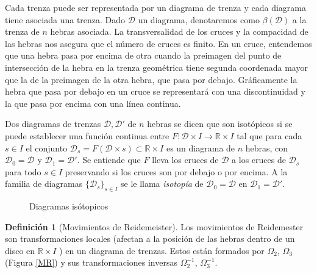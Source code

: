 \documentclass[12pt]{book}
\theoremstyle{definition}
\newtheorem{defi}{Definición}[section]
\begin{document}
Cada trenza puede ser representada por un diagrama de trenza y cada diagrama tiene asociada una trenza. Dado $\mathcal{D}$ un diagrama, denotaremos como $\beta(\mathcal{D})$ a la trenza de $n$ hebras asociada. La transversalidad de los cruces y la compacidad de las hebras nos asegura que el número de cruces es finito. En un cruce, entendemos que una hebra pasa por encima de otra cuando la preimagen del punto de intersección de la hebra en la trenza geométrica tiene segunda coordenada mayor que la de la preimagen de la otra hebra, que pasa por debajo. Gráficamente la hebra que pasa por debajo en un cruce se representará con una discontinuidad y la que pasa por encima con una línea continua. 

Dos diagramas de trenzas $\mathcal{D}, \mathcal{D}'$ de $n$ hebras se dicen que son isotópicos si se puede establecer una función continua entre $F:\mathcal{D}\times I\rightarrow\mathbb{R}\times I$ tal que para cada $s\in I$ el conjunto $\mathcal{D}_s = F(\mathcal{D}\times s)\subset\mathbb{R}\times I$ es un diagrama de $n$ hebras, con $\mathcal{D}_0 = \mathcal{D}$ y $\mathcal{D}_1 = \mathcal{D}'$. Se entiende que $F$ lleva los cruces de $\mathcal{D}$ a los cruces de $\mathcal{D}_s$ para todo $s\in I$ preservando si los cruces son por debajo o por encima. A la familia de diagramas $\{\mathcal{D}_s\}_{s\in I}$ se le llama \textit{isotopía} de $\mathcal{D}_0 = \mathcal{D}$ en $\mathcal{D}_1 = \mathcal{D}'$.




\begin{figure}[h!]
\centering
{}
\caption{Diagramas isótopicos}
\label{fig:d_iso}
\end{figure}







\begin{defi}[Movimientos de Reidemeister]  Los movimientos de Reidemester son transformaciones locales (afectan a la posición de las hebras dentro de un disco en 
$ \mathbb{R}\times I $ ) en un diagrama de trenzas. Estos están formados por $\Omega_2$, $\Omega_3$ (Figura \ref{MR}) y sus transformaciones inversas
$\Omega_2^{-1}$, $\Omega_3^{-1}$. 

\end{defi}
\end{document}
